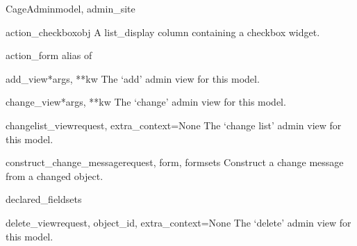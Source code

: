 \documentclass[letterpaper,10pt,english]{sphinxmanual}
\begin{document}
\hypertarget{animal.admin.CageAdmin}{}\begin{classdesc}{CageAdmin}{model, admin\_site}~

\hypertarget{animal.admin.CageAdmin.action_checkbox}{}\begin{methoddesc}{action\_checkbox}{obj}
A list\_display column containing a checkbox widget.
\end{methoddesc}

\hypertarget{animal.admin.CageAdmin.action_form}{}\begin{memberdesc}{action\_form}
alias of 
\end{memberdesc}

\hypertarget{animal.admin.CageAdmin.add_view}{}\begin{methoddesc}{add\_view}{*args, **kw}
The `add' admin view for this model.
\end{methoddesc}

\hypertarget{animal.admin.CageAdmin.change_view}{}\begin{methoddesc}{change\_view}{*args, **kw}
The `change' admin view for this model.
\end{methoddesc}

\hypertarget{animal.admin.CageAdmin.changelist_view}{}\begin{methoddesc}{changelist\_view}{request, extra\_context=None}
The `change list' admin view for this model.
\end{methoddesc}

\hypertarget{animal.admin.CageAdmin.construct_change_message}{}\begin{methoddesc}{construct\_change\_message}{request, form, formsets}
Construct a change message from a changed object.
\end{methoddesc}

\hypertarget{animal.admin.CageAdmin.declared_fieldsets}{}\begin{memberdesc}{declared\_fieldsets}\end{memberdesc}

\hypertarget{animal.admin.CageAdmin.delete_view}{}\begin{methoddesc}{delete\_view}{request, object\_id, extra\_context=None}
The `delete' admin view for this model.
\end{methoddesc}


\end{classdesc}
\end{document}
